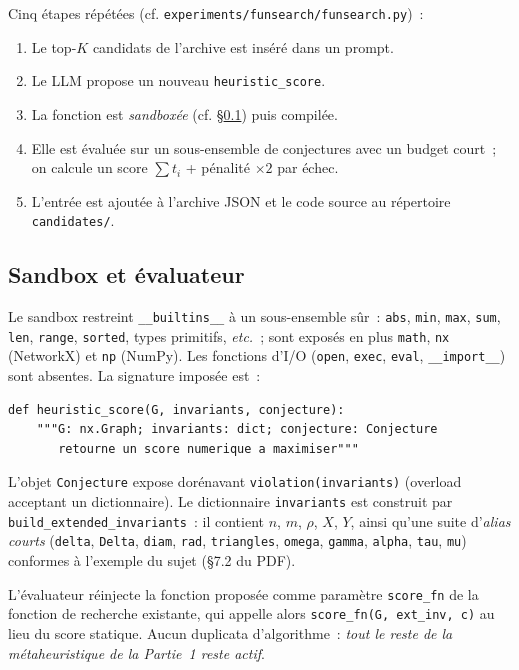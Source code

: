 \documentclass[11pt,a4paper]{article}
\begin{document}
Cinq étapes répétées (cf. \texttt{experiments/funsearch/funsearch.py})~:
\begin{enumerate}
  \item Le top-$K$ candidats de l'archive est inséré dans un prompt.
  \item Le LLM propose un nouveau \texttt{heuristic\_score}.
  \item La fonction est \emph{sandboxée} (cf. \S\ref{sec:sandbox}) puis
    compilée.
  \item Elle est évaluée sur un sous-ensemble de conjectures avec un budget
    court~; on calcule un score $\sum t_i$ + pénalité $\times 2$ par échec.
  \item L'entrée est ajoutée à l'archive JSON et le code source au répertoire
    \texttt{candidates/}.
\end{enumerate}

\subsection{Sandbox et évaluateur}
\label{sec:sandbox}

Le sandbox restreint \texttt{\_\_builtins\_\_} à un sous-ensemble sûr~:
\texttt{abs}, \texttt{min}, \texttt{max}, \texttt{sum}, \texttt{len},
\texttt{range}, \texttt{sorted}, types primitifs, \emph{etc.}~; sont exposés
en plus \texttt{math}, \texttt{nx} (NetworkX) et \texttt{np} (NumPy). Les
fonctions d'I/O (\texttt{open}, \texttt{exec}, \texttt{eval},
\texttt{\_\_import\_\_}) sont absentes. La signature imposée est~:
\begin{lstlisting}[style=py]
def heuristic_score(G, invariants, conjecture):
    """G: nx.Graph; invariants: dict; conjecture: Conjecture
       retourne un score numerique a maximiser"""
\end{lstlisting}

L'objet \texttt{Conjecture} expose dorénavant
\texttt{violation(invariants)} (overload acceptant un dictionnaire). Le
dictionnaire \texttt{invariants} est construit par
\texttt{build\_extended\_invariants}~: il contient $n$, $m$, $\rho$, $X$,
$Y$, ainsi qu'une suite d'\emph{alias courts} (\texttt{delta}, \texttt{Delta},
\texttt{diam}, \texttt{rad}, \texttt{triangles}, \texttt{omega},
\texttt{gamma}, \texttt{alpha}, \texttt{tau}, \texttt{mu}) conformes à
l'exemple du sujet (\S7.2 du PDF).

L'évaluateur réinjecte la fonction proposée comme paramètre \texttt{score\_fn}
de la fonction de recherche existante, qui appelle alors
\texttt{score\_fn(G, ext\_inv, c)} au lieu du score statique. Aucun
duplicata d'algorithme~: \emph{tout le reste de la métaheuristique de la
Partie~1 reste actif}.
\end{document}
